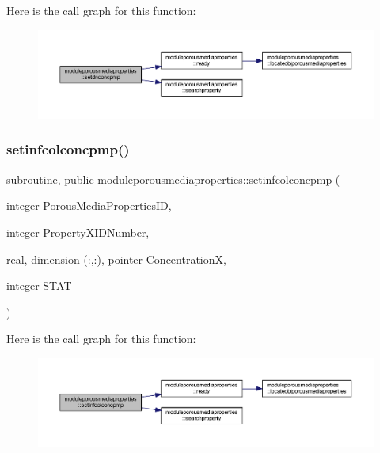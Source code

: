Here is the call graph for this function\+:\nopagebreak
\begin{figure}[H]
\begin{center}
\leavevmode
\includegraphics[width=350pt]{namespacemoduleporousmediaproperties_a06259226fc0457f3a2a483e2de48d783_cgraph}
\end{center}
\end{figure}
\mbox{\label{namespacemoduleporousmediaproperties_ad6dda3a878f9da43d0b12164c09edd9d}} 
\subsubsection{\texorpdfstring{setinfcolconcpmp()}{setinfcolconcpmp()}}
{\footnotesize\ttfamily subroutine, public moduleporousmediaproperties\+::setinfcolconcpmp (\begin{DoxyParamCaption}\item[{integer}]{Porous\+Media\+Properties\+ID,  }\item[{integer}]{Property\+X\+I\+D\+Number,  }\item[{real, dimension (\+:,\+:), pointer}]{ConcentrationX,  }\item[{integer}]{S\+T\+AT }\end{DoxyParamCaption})}

Here is the call graph for this function\+:\nopagebreak
\begin{figure}[H]
\begin{center}
\leavevmode
\includegraphics[width=350pt]{namespacemoduleporousmediaproperties_ad6dda3a878f9da43d0b12164c09edd9d_cgraph}
\end{center}
\end{figure}
\mbox{\label{namespacemoduleporousmediaproperties_aa132ced55703c339565649a0065925da}} 
